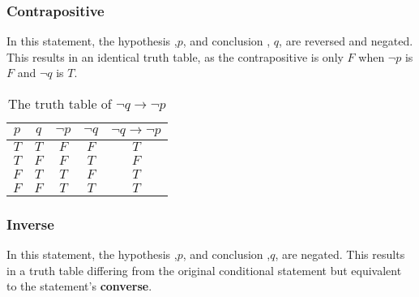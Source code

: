 \documentclass[12pt letter]{report}
\begin{document}
\subsubsection{Contrapositive}


In this statement, the hypothesis ,$p$, and conclusion , $q$, are reversed and negated. This results in an identical
truth table, as the contrapositive is only $F$ when $\neg p$ is $F$ and $\neg q$ is $T$.


\begin{table}[h!]
  \caption{The truth table of $\neg q \to  \neg p$}\label{tab:6}
  \begin{center}
    \begin{tabular}{|c c|c c|c|}
      \hline
      $p$ & $q$ & $ \neg p $ & $\neg q$ & $\neg q \to  \neg p$ \\[0.5ex]
      \hline
      \hline
      $T$ & $T$ & $F$        & $F$      & $T$                  \\
      $T$ & $F$ & $F$        & $T$      & $F$                  \\
      $F$ & $T$ & $T$        & $F$      & $T$                  \\
      $F$ & $F$ & $T$        & $T$      & $T$                  \\
      \hline
    \end{tabular}
  \end{center}
\end{table}


\subsubsection{Inverse}


In this statement, the hypothesis ,$p$, and conclusion ,$q$, are negated. This results in a truth table differing from
the original conditional statement but equivalent to the statement's \textbf{converse}.

\end{document}
